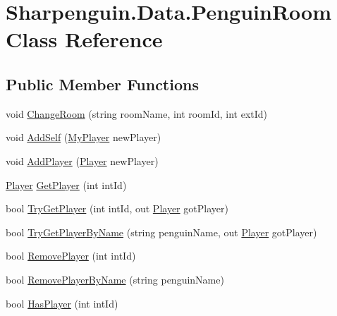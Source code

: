 \hypertarget{classSharpenguin_1_1Data_1_1PenguinRoom}{\section{Sharpenguin.\-Data.\-Penguin\-Room Class Reference}
\label{classSharpenguin_1_1Data_1_1PenguinRoom}
}
\subsection*{Public Member Functions}
\begin{DoxyCompactItemize}
\item 
void \hyperlink{classSharpenguin_1_1Data_1_1PenguinRoom_a6eb23989f397ce69a2365aff0ee42adb}{Change\-Room} (string room\-Name, int room\-Id, int ext\-Id)
\item 
void \hyperlink{classSharpenguin_1_1Data_1_1PenguinRoom_a1499f4cd3bd32d41e11c6a8cd0c70de4}{Add\-Self} (\hyperlink{classSharpenguin_1_1Data_1_1MyPlayer}{My\-Player} new\-Player)
\item 
void \hyperlink{classSharpenguin_1_1Data_1_1PenguinRoom_a25c1b2ce59c3cd19d90d3e4d76929788}{Add\-Player} (\hyperlink{classSharpenguin_1_1Data_1_1Player}{Player} new\-Player)
\item 
\hyperlink{classSharpenguin_1_1Data_1_1Player}{Player} \hyperlink{classSharpenguin_1_1Data_1_1PenguinRoom_a2b9490bdf704b051a9b1edcdaeb420ab}{Get\-Player} (int int\-Id)
\item 
bool \hyperlink{classSharpenguin_1_1Data_1_1PenguinRoom_aac8f948d0d296520efc706c6a22a2b11}{Try\-Get\-Player} (int int\-Id, out \hyperlink{classSharpenguin_1_1Data_1_1Player}{Player} got\-Player)
\item 
bool \hyperlink{classSharpenguin_1_1Data_1_1PenguinRoom_a11e805d83a9b2769d5dfbbe6931ef4e8}{Try\-Get\-Player\-By\-Name} (string penguin\-Name, out \hyperlink{classSharpenguin_1_1Data_1_1Player}{Player} got\-Player)
\item 
bool \hyperlink{classSharpenguin_1_1Data_1_1PenguinRoom_a2843fba06f2bd503a09a89e0e6ba87fa}{Remove\-Player} (int int\-Id)
\item 
bool \hyperlink{classSharpenguin_1_1Data_1_1PenguinRoom_a5a613e61b542886c45f3b9eb7cd17c53}{Remove\-Player\-By\-Name} (string penguin\-Name)
\item 
bool \hyperlink{classSharpenguin_1_1Data_1_1PenguinRoom_ac0851db56a7e51dfa7a542483157eb8e}{Has\-Player} (int int\-Id)
\end{DoxyCompactItemize}
